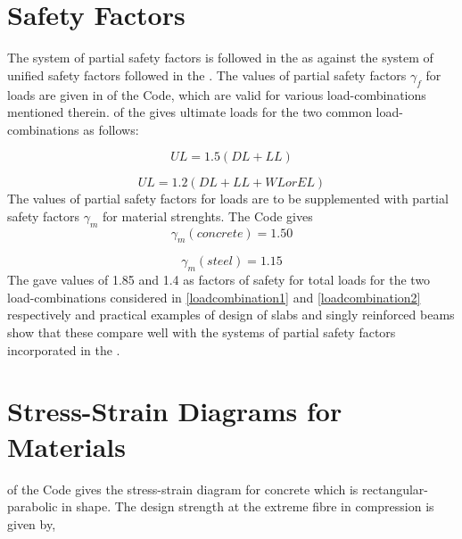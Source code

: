 \section{Safety Factors}

The system of partial safety factors is followed in the
 as against the system of unified safety factors
followed in the . The values of partial safety
factors ${\gamma_f}$ for loads are given in  of the Code, which
are valid for various load-combinations mentioned therein. 
of the  gives ultimate loads for the two common
load-combinations as follows:

\begin{equation}
UL = 1.5 (DL + LL)
\label{loadcombination1}
\end{equation}

\begin{equation}
UL = 1.2 (DL + LL + WL or EL)
\label{loadcombination2}
\end{equation}
The values of partial safety factors for loads are to be supplemented
with partial safety factors $\gamma_m$ for material strenghts. The Code gives           
\begin{equation}
\gamma_m (concrete) = 1.50
\label{SaftyFactorConcrete1}
\end{equation}

\begin{equation}
\gamma_m (steel) = 1.15 
\label{SaftyFactorConcrete2}
\end{equation}
The  gave values of 1.85 and 1.4 as factors of
safety for total loads for the two load-combinations considered in
\eqn \ref{loadcombination1} and \eqn \ref{loadcombination2} respectively
and practical examples of design of slabs and singly reinforced beams
show that these compare well with the systems of partial safety factors
incorporated in the .

\section{Stress-Strain Diagrams for Materials}

 of the Code gives the stress-strain diagram for concrete which
is rectangular-parabolic in shape. The design strength at the extreme
fibre in compression is given by,

